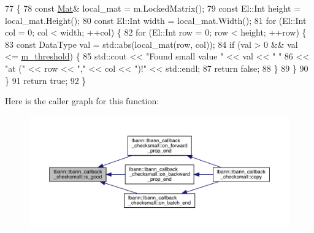 \begin{DoxyCode}
77                                                            \{
78   \textcolor{keyword}{const} \hyperlink{base_8hpp_a68f11fdc31b62516cb310831bbe54d73}{Mat}& local\_mat = m.LockedMatrix();
79   \textcolor{keyword}{const} El::Int height = local\_mat.Height();
80   \textcolor{keyword}{const} El::Int width = local\_mat.Width();
81   \textcolor{keywordflow}{for} (El::Int col = 0; col < width; ++col) \{
82     \textcolor{keywordflow}{for} (El::Int row = 0; row < height; ++row) \{
83       \textcolor{keyword}{const} DataType val = std::abs(local\_mat(row, col));
84       \textcolor{keywordflow}{if} (val > 0 && val <= \hyperlink{classlbann_1_1lbann__callback__checksmall_a2c37cd93bca10f6fb42348c2e6b0016e}{m\_threshold}) \{
85         std::cout << \textcolor{stringliteral}{"Found small value "} << val << \textcolor{stringliteral}{" "}
86                   << \textcolor{stringliteral}{"at ("} << row << \textcolor{stringliteral}{","} << col << \textcolor{stringliteral}{")!"} << std::endl;
87         \textcolor{keywordflow}{return} \textcolor{keyword}{false};
88       \}
89     \}
90   \}
91   \textcolor{keywordflow}{return} \textcolor{keyword}{true};
92 \}
\end{DoxyCode}
Here is the caller graph for this function\+:\nopagebreak
\begin{figure}[H]
\begin{center}
\leavevmode
\includegraphics[width=350pt]{classlbann_1_1lbann__callback__checksmall_afe78f539ba3b2ad3e6ae8c468850052c_icgraph}
\end{center}
\end{figure}
\mbox{\label{classlbann_1_1lbann__callback__checksmall_acbdd897ecbe5a27b59db15ae7662e0f9}} 
